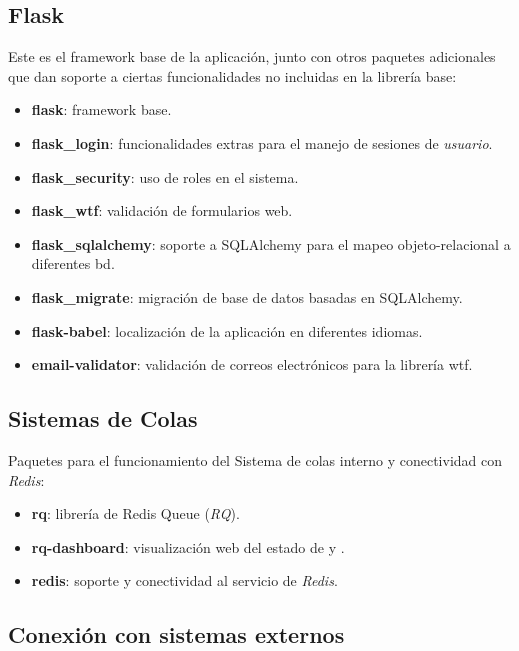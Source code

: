 \documentclass[11pt,spanish,listoffigures,listoftables]{tfgetsinf}
\begin{document}
\subsection{Flask}

Este es el framework base de la aplicación, junto con otros \Gls{paquete}s adicionales que dan soporte a ciertas funcionalidades no incluidas en la librería base:

\begin{itemize}
	\item \textbf{flask}: framework base.
	\item \textbf{flask\_login}: funcionalidades extras para el manejo de sesiones de \textit{usuario}.
	\item \textbf{flask\_security}: uso de roles en el sistema.
	\item \textbf{flask\_wtf}: validación de formularios web.
	\item \textbf{flask\_sqlalchemy}: soporte a SQLAlchemy para el mapeo objeto-relacional a diferentes \acrshort{bd}.
	\item \textbf{flask\_migrate}: migración de base de datos basadas en SQLAlchemy.
	\item \textbf{flask-babel}: localización de la aplicación en diferentes idiomas.
	\item \textbf{email-validator}: validación de correos electrónicos para la librería wtf.
\end{itemize}

\subsection{Sistemas de Colas}

Paquetes para el  funcionamiento del Sistema de \gls{cola}s interno y conectividad con \textit{Redis}:

\begin{itemize}
	\item \textbf{rq}: librería de Redis Queue (\textit{RQ}).
	\item \textbf{rq-dashboard}: visualización web del estado de  y .
	\item \textbf{redis}: soporte y conectividad al servicio de \textit{Redis}.
\end{itemize}

\subsection{Conexión con sistemas externos}
\end{document}
